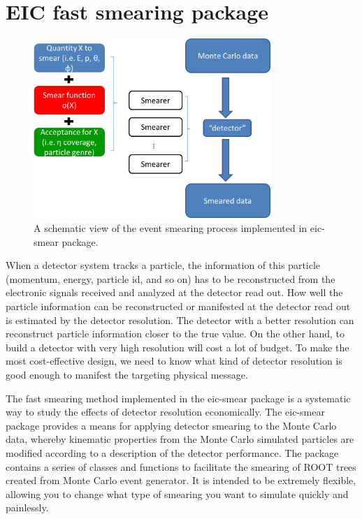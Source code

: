 %

\section{EIC fast smearing package}


\begin{figure}
\centering
\includegraphics[width=0.8\textwidth]{plots/chpt5/smearing framework.png}
\caption[An illustration of the event smearing strategy in eic-smear package] {
A schematic view of the event smearing process implemented in eic-smear package. 
}
\label{fig:smear_layout}
\end{figure}


When a detector system tracks a particle, the information of this particle
(momentum, energy, particle id, and so on) has to be reconstructed from the electronic
signals received and analyzed at the detector read out. How well the particle
information can be reconstructed or manifested at the detector read out is
estimated by the detector resolution. The detector with a better resolution
can reconstruct particle information closer to the true value. On
the other hand, to build a detector with very high resolution will cost a lot
of budget. To make the most cost-effective design, we need to know what kind
of detector resolution is good enough to manifest the targeting physical message.

The fast smearing method implemented in the eic-smear package is a systematic
way to study the effects of detector resolution economically. The eic-smear
package provides a means for applying detector smearing to the Monte Carlo
data, whereby kinematic properties from the Monte Carlo simulated particles are modified according
to a description of the detector performance. The package contains a series of
classes and functions to facilitate the smearing of ROOT trees created from
Monte Carlo event generator. It is intended to be extremely flexible,
allowing you to change what type of smearing you want to simulate quickly and
painlessly.

